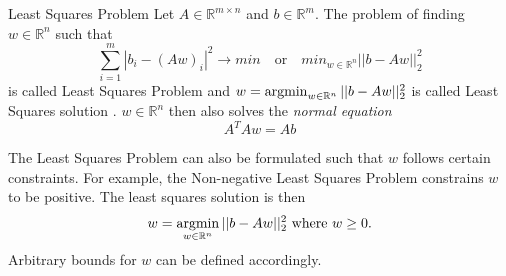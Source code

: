\begin{definition}{Least Squares Problem}
Let $A \in \mathbb{R}^{m \times n}$ and $b \in \mathbb{R}^m$. The problem of finding $w \in \mathbb{R}^n$ such that \begin{equation}
\sum_{i=1}^m |b_i - (Aw)_i|^2 \rightarrow min \quad \text{or} \quad min_{w\in \mathbb{R}^n} ||b - Aw||_2^2
\end{equation} is called Least Squares Problem and $w = \operatorname*{argmin}_{w\in \mathbb{R}^n} ||b - Aw||_2^2$ is called Least Squares solution \cite{goetz}. $w \in \mathbb{R}^n$ then also solves the \textit{normal equation} \begin{equation}
A^TAw = Ab
\end{equation}
\end{definition}
The Least Squares Problem can also be formulated such that $w$ follows certain constraints. For example, the Non-negative Least Squares Problem constrains $w$ to be positive. The least squares solution is then 
\begin{equation}
w = \operatorname*{argmin}_{w\in \mathbb{R}^n} ||b - Aw||_2^2 \text{ where } w \geq 0\text{.}
\end{equation} Arbitrary bounds for $w$ can be defined accordingly.
\newpage